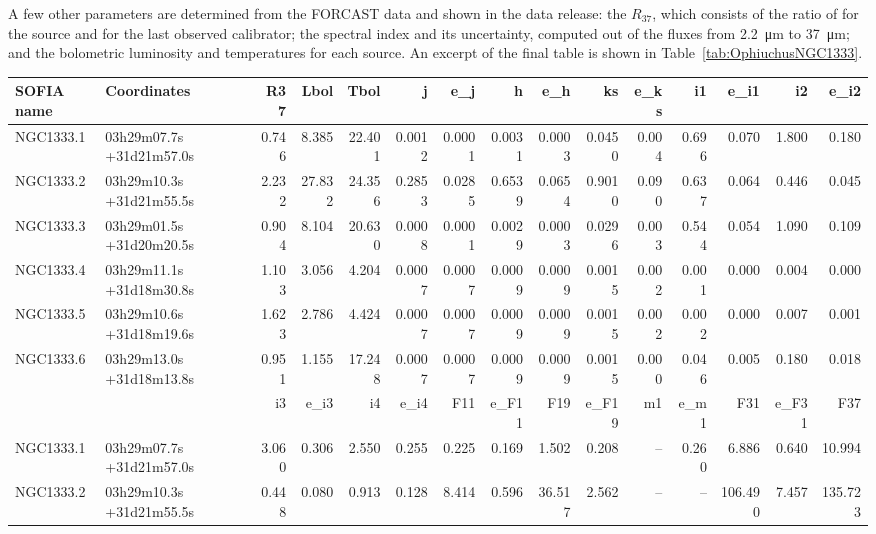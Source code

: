A few other parameters are determined from the FORCAST data and shown in the data release: the $R_{37}$, which consists of the ratio of \Rfifty for the source and \Rfifty for the last observed calibrator; the spectral index and its uncertainty, computed out of the fluxes from \SI{2.2}{\um} to \SI{37}{\um}; and the bolometric luminosity and temperatures for each source. An excerpt of the final table is shown in Table~\ref {tab:OphiuchusNGC1333}.
\begin{landscape}
\begin{table}[!h]
\tiny
\caption[NGC1333 photometry]{Extract of NGC1333 photometry.}
\label{tab:OphiuchusNGC1333}
\vspace{-0.5cm}
\begin{longtable}{llrrrrrrrrrrrrr}
 \toprule																														
SOFIA name	&	Coordinates		&	R37	&	Lbol	&	Tbol	&	j	&	e\_j	&	h	&	e\_h	&	ks	&	e\_ks	&	i1	&	e\_i1	&	i2	&	e\_i2	\\
\midrule																														
NGC1333.1	&	03h29m07.7s	+31d21m57.0s	&	0.746	&	8.385	&	22.401	&	0.0012	&	0.0001	&	0.0031	&	0.0003	&	0.0450	&	0.004	&	0.696	&	0.070	&	1.800	&	0.180	\\
NGC1333.2	&	03h29m10.3s	+31d21m55.5s	&	2.232	&	27.832	&	24.356	&	0.2853	&	0.0285	&	0.6539	&	0.0654	&	0.9010	&	0.090	&	0.637	&	0.064	&	0.446	&	0.045	\\
NGC1333.3	&	03h29m01.5s	+31d20m20.5s	&	0.904	&	8.104	&	20.630	&	0.0008	&	0.0001	&	0.0029	&	0.0003	&	0.0296	&	0.003	&	0.544	&	0.054	&	1.090	&	0.109	\\
NGC1333.4	&	03h29m11.1s	+31d18m30.8s	&	1.103	&	3.056	&	4.204	&	0.0007	&	0.0007	&	0.0009	&	0.0009	&	0.0015	&	0.002	&	0.001	&	0.000	&	0.004	&	0.000	\\
NGC1333.5	&	03h29m10.6s	+31d18m19.6s	&	1.623	&	2.786	&	4.424	&	0.0007	&	0.0007	&	0.0009	&	0.0009	&	0.0015	&	0.002	&	0.002	&	0.000	&	0.007	&	0.001	\\
NGC1333.6	&	03h29m13.0s	+31d18m13.8s	&	0.951	&	1.155	&	17.248	&	0.0007	&	0.0007	&	0.0009	&	0.0009	&	0.0015	&	0.000	&	0.046	&	0.005	&	0.180	&	0.018	\\
\midrule																														
	&			&	i3	&	e\_i3	&	i4	&	e\_i4	&	F11	&	e\_F11	&	F19	&	e\_F19	&	m1	&	e\_m1	&	F31	&	e\_F31	&	F37	\\
\midrule																														
NGC1333.1	&	03h29m07.7s	+31d21m57.0s	&	3.060	&	0.306	&	2.550	&	0.255	&	0.225	&	0.169	&	1.502	&	0.208	&	--	&	0.260	&	6.886	&	0.640	&	10.994	\\
NGC1333.2	&	03h29m10.3s	+31d21m55.5s	&	0.448	&	0.080	&	0.913	&	0.128	&	8.414	&	0.596	&	36.517	&	2.562	&	--	&	--	&	106.490	&	7.457	&	135.723	\\

\end{longtable}
\end{table}
\end{landscape}
